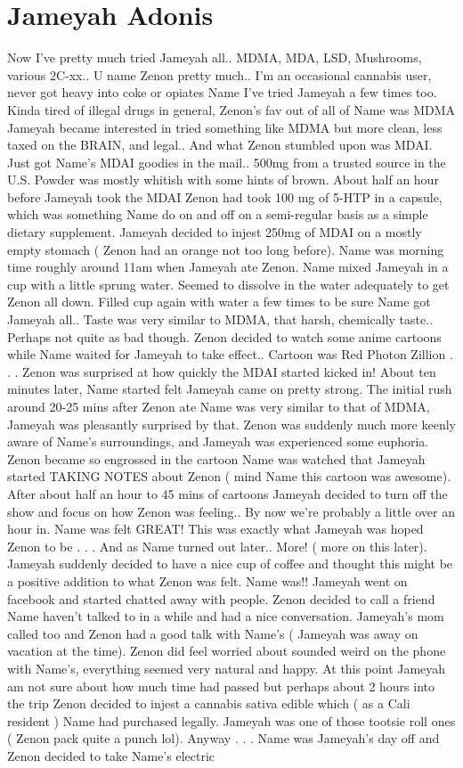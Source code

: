 \documentclass[12pt]{book}
\begin{document}
\chapter{Jameyah Adonis}

Now I've pretty much tried Jameyah all.. MDMA, MDA, LSD, Mushrooms, various 2C-xx.. U name Zenon pretty much.. I'm an occasional cannabis user, never got heavy into coke or opiates Name I've tried Jameyah a few times too. Kinda tired of illegal drugs in general, Zenon's fav out of all of Name was MDMA Jameyah became interested in tried something like MDMA but more clean, less taxed on the BRAIN, and legal.. And what Zenon stumbled upon was MDAI. Just got Name's MDAI goodies in the mail.. 500mg from a trusted source in the U.S. Powder was mostly whitish with some hints of brown. About half an hour before Jameyah took the MDAI Zenon had took 100 mg of 5-HTP in a capsule, which was something Name do on and off on a semi-regular basis as a simple dietary supplement. Jameyah decided to injest 250mg of MDAI on a mostly empty stomach ( Zenon had an orange not too long before). Name was morning time roughly around 11am when Jameyah ate Zenon. Name mixed Jameyah in a cup with a little sprung water. Seemed to dissolve in the water adequately to get Zenon all down. Filled cup again with water a few times to be sure Name got Jameyah all.. Taste was very similar to MDMA, that harsh, chemically taste.. Perhaps not quite as bad though. Zenon decided to watch some anime cartoons while Name waited for Jameyah to take effect.. Cartoon was Red Photon Zillion . . .  Zenon was surprised at how quickly the MDAI started kicked in! About ten minutes later, Name started felt Jameyah came on pretty strong. The initial rush around 20-25 mins after Zenon ate Name was very similar to that of MDMA, Jameyah was pleasantly surprised by that. Zenon was suddenly much more keenly aware of Name's surroundings, and Jameyah was experienced some euphoria. Zenon became so engrossed in the cartoon Name was watched that Jameyah started TAKING NOTES about Zenon ( mind Name this cartoon was awesome). After about half an hour to 45 mins of cartoons Jameyah decided to turn off the show and focus on how Zenon was feeling.. By now we're probably a little over an hour in. Name was felt GREAT! This was exactly what Jameyah was hoped Zenon to be . . .  And as Name turned out later.. More! ( more on this later). Jameyah suddenly decided to have a nice cup of coffee and thought this might be a positive addition to what Zenon was felt. Name was!! Jameyah went on facebook and started chatted away with people. Zenon decided to call a friend Name haven't talked to in a while and had a nice conversation. Jameyah's mom called too and Zenon had a good talk with Name's ( Jameyah was away on vacation at the time). Zenon did feel worried about sounded weird on the phone with Name's, everything seemed very natural and happy. At this point Jameyah am not sure about how much time had passed but perhaps about 2 hours into the trip Zenon decided to injest a cannabis sativa edible which ( as a Cali resident ) Name had purchased legally. Jameyah was one of those tootsie roll ones ( Zenon pack quite a punch lol). Anyway . . .  Name was Jameyah's day off and Zenon decided to take Name's electric 
\end{document}
